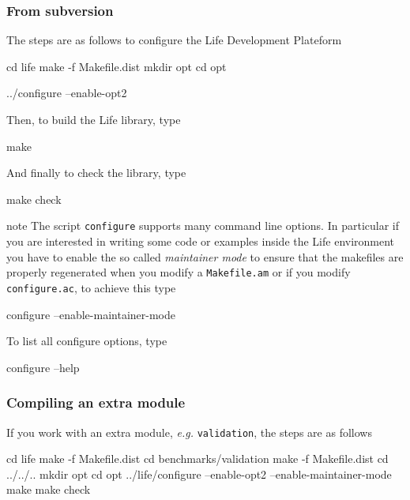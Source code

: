 \documentclass[a4paper]{book}
\newcommand{\ficnote}{note}
\newenvironment{note}{%
  \begin{pictonote}{\ficnote}}{\end{pictonote}}
\begin{document}
\subsubsection{From subversion}
\label{sec:from-subversion}

The steps are as follows to configure the Life Development Plateform

\begin{unixcom}
  cd life
  make -f Makefile.dist
  mkdir opt
  cd opt

  ../configure --enable-opt2
\end{unixcom}

Then, to build  the Life library, type
\begin{unixcom}
  make
\end{unixcom}

And finally to check the library, type
\begin{unixcom}
  make check
\end{unixcom}


\begin{note}
  The script \lstinline!configure! supports many command line
  options. In particular if you are interested in writing some code or
  examples inside the Life environment you have to enable the so
  called \emph{maintainer mode} to ensure that the makefiles are
  properly regenerated when you modify a \lstinline!Makefile.am! or if
  you modify \lstinline!configure.ac!, to achieve this type
  \begin{unixcom}
    configure --enable-maintainer-mode
  \end{unixcom}
  To list all configure options, type
  \begin{unixcom}
    configure --help
  \end{unixcom}
\end{note}


\subsubsection{Compiling an extra module}
\label{sec:compile-an-extra}

If you work with an extra module, \emph{e.g.} \lstinline!validation!, the steps are as follows
\begin{unixcom}
cd life
make -f Makefile.dist
cd benchmarks/validation
make -f Makefile.dist
cd ../../..
mkdir opt
cd opt
../life/configure --enable-opt2 --enable-maintainer-mode
make
make check
\end{unixcom}
\end{document}
